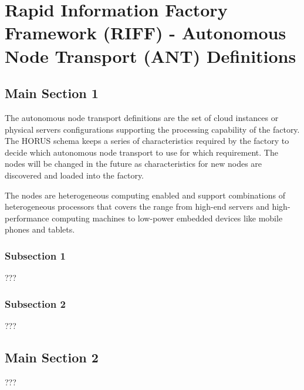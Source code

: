 
\chapter{Rapid Information Factory Framework (RIFF) - Autonomous Node Transport (ANT) Definitions} %

\label{Chapter18} %



\section{Main Section 1}

The autonomous node transport definitions are the set of cloud instances or physical servers configurations supporting the processing capability of the factory. The HORUS schema keeps a series of characteristics required by the factory to decide which autonomous node transport to use for which requirement. The nodes will be changed in the future as characteristics for new nodes are discovered and loaded into the factory.

The nodes are heterogeneous computing enabled and support combinations of heterogeneous processors that covers the range from high-end servers and high-performance computing machines to low-power embedded devices like mobile phones and tablets.

\subsection{Subsection 1}

???


\subsection{Subsection 2}

???


\section{Main Section 2}

???
